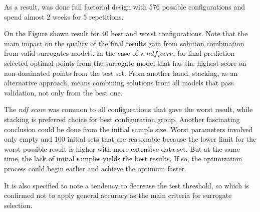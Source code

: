     As a result, was done full factorial design with 576 possible configurations and spend almost 2 weeks for 5 repetitions.

    On the Figure shown result for 40 best and worst configurations. Note that the main impact on the quality of the final results gain from solution combination from valid surrogates models. In the case of a $ndf_score$, for final prediction selected optimal points from the surrogate model that has the highest score on non-dominated points from the test set. From another hand, stacking, as an alternative approach, means combining solutions from all models that pass validation, not only from the best one.

    The \emph{ndf score}  was common to all configurations that gave the worst result, while stacking is preferred choice for best configuration group. Another fascinating conclusion could be done from the initial sample size. Worst parameters involved only empty and 100 initial sets that are reasonable because the lower limit for the worst possible result is higher with more extensive data set. But at the same time, the lack of initial samples yields the best results. If so, the optimization process could begin earlier and achieve the optimum faster. 

    It is also specified to note a tendency to decrease the test threshold, so which is confirmed not to apply general accuracy as the main criteria for surrogate selection.

